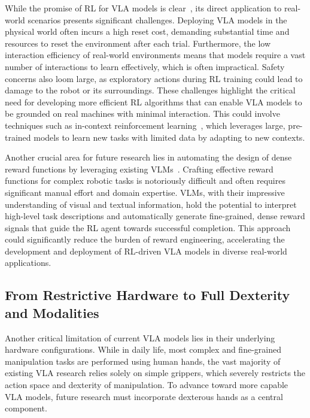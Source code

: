 \documentclass[10pt, a4paper, logo, copyright]{googledeepmind} %
\begin{document}
While the promise of RL for VLA models is clear~\cite{hu2024flare, lu2025vla, chen2025conrft, liu2025can, li2025simplevlarl, guo2025improving}, its direct application to real-world scenarios presents significant challenges. Deploying VLA models in the physical world often incurs a high reset cost, demanding substantial time and resources to reset the environment after each trial. Furthermore, the low interaction efficiency of real-world environments means that models require a vast number of interactions to learn effectively, which is often impractical. Safety concerns also loom large, as exploratory actions during RL training could lead to damage to the robot or its surroundings. These challenges highlight the critical need for developing more efficient RL algorithms that can enable VLA models to be grounded on real machines with minimal interaction. This could involve techniques such as in-context reinforcement learning~\citep{moeini2025survey}, which leverages large, pre-trained models to learn new tasks with limited data by adapting to new contexts.

Another crucial area for future research lies in automating the design of dense reward functions by leveraging existing VLMs~\citep{rlgpt, minedojo}. Crafting effective reward functions for complex robotic tasks is notoriously difficult and often requires significant manual effort and domain expertise. VLMs, with their impressive understanding of visual and textual information, hold the potential to interpret high-level task descriptions and automatically generate fine-grained, dense reward signals that guide the RL agent towards successful completion. This approach could significantly reduce the burden of reward engineering, accelerating the development and deployment of RL-driven VLA models in diverse real-world applications. 

\subsection{From Restrictive Hardware to Full Dexterity and Modalities}
\label{subsec:full-dexterity}

Another critical limitation of current VLA models lies in their underlying hardware configurations. While in daily life, most complex and fine-grained manipulation tasks are performed using human hands, the vast majority of existing VLA research relies solely on simple grippers, which severely restricts the action space and dexterity of manipulation. To advance toward more capable VLA models, future research must incorporate dexterous hands as a central component.
\end{document}
